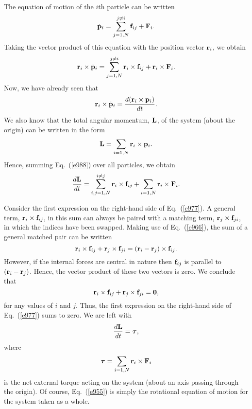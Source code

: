 The equation of motion of the $i$th particle can be written
\begin{equation}
\dot{\bf p}_i = \sum_{j=1,N}^{j\neq i} {\bf f}_{ij} + {\bf F}_i.
\end{equation}
Taking the vector product of this equation with the position vector ${\bf r}_i$, we
obtain
\begin{equation}\label{e988}
{\bf r}_i\times \dot{\bf p}_i = \sum_{j=1,N}^{j\neq i} {\bf r}_i\times {\bf f}_{ij} + 
{\bf r}_i\times {\bf F}_i.
\end{equation}
Now, we have already seen that
\begin{equation}
{\bf r}_i\times \dot{\bf p}_i = \frac{d ({\bf r}_i\times {\bf p}_i)}{dt}.
\end{equation}
We also know that the total angular momentum, ${\bf L}$, of the system (about the origin) can
be written in the form
\begin{equation}
{\bf L} = \sum_{i=1,N} {\bf r}_i\times {\bf p}_i.
\end{equation}
Hence, summing Eq.~(\ref{e988}) over all particles, we obtain
\begin{equation}\label{e977}
\frac{d {\bf L}}{dt} = \sum_{i,j = 1,N}^{i\neq j} {\bf r}_i\times {\bf f}_{ij} + 
\sum_{i=1,N} {\bf r}_i\times {\bf F}_i.
\end{equation}

Consider the first expression on the right-hand side of Eq.~(\ref{e977}). A general term,
${\bf r}_i\times {\bf f}_{ij}$, in this sum can always be paired with a
matching term, ${\bf r}_j\times {\bf f}_{ji}$, in which the indices have been swapped.
Making use of Eq.~(\ref{e966}), the sum of a general matched pair  can be written
\begin{equation}
{\bf r}_i\times {\bf f}_{ij}+{\bf r}_j\times {\bf f}_{ji} = 
({\bf r}_i-{\bf r}_j)\times {\bf f}_{ij}.
\end{equation}
However, if the internal forces are central in nature then ${\bf f}_{ij}$ is parallel
to $({\bf r}_i-{\bf r}_j)$. Hence, the vector product of these two vectors is zero.
We conclude that
\begin{equation}
{\bf r}_i\times {\bf f}_{ij}+{\bf r}_j\times {\bf f}_{ji} = {\bf 0},
\end{equation}
for any values of $i$ and $j$. Thus, the first expression on the right-hand side of Eq.~(\ref{e977})
sums to zero. We are left with
\begin{equation}\label{e955}
\frac{d {\bf L}}{dt} = \mbox{\boldmath$\tau$},
\end{equation}
where
\begin{equation}
\mbox{\boldmath$\tau$} = \sum_{i=1,N} {\bf r}_i\times {\bf F}_i
\end{equation}
is the net external torque acting on the system (about an axis
passing through the origin). Of course, Eq.~(\ref{e955})
is simply the rotational equation of motion for the system taken as a whole.

